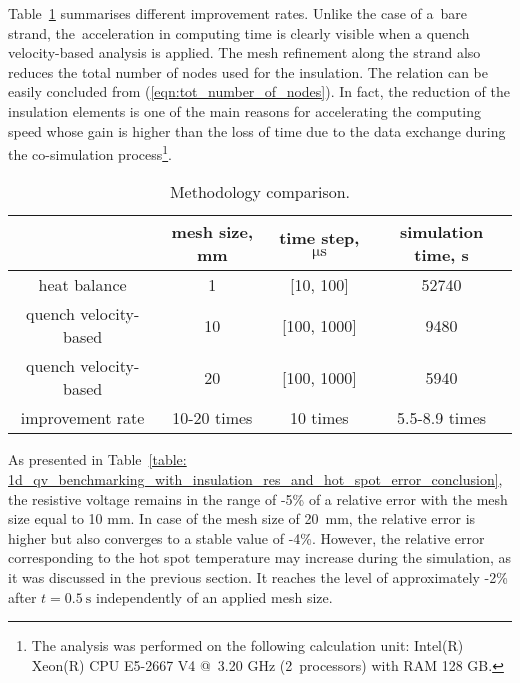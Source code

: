 
Table~\ref{table: 1d_qv_benchmarking_with_insulation_methods_comparison} summarises different improvement rates. Unlike the case of a~bare strand, the~acceleration in computing time is clearly visible when a quench velocity-based analysis is applied. The mesh refinement along the strand also reduces the total number of nodes used for the insulation. The relation can be easily concluded from (\ref{eqn:tot_number_of_nodes}). In fact, the reduction of the insulation elements is one of the main reasons for accelerating the computing speed whose gain is higher than the loss of time due to the data exchange during the co-simulation process\footnote{The analysis was performed on the following calculation unit: Intel(R) Xeon(R) CPU E5-2667 V4 @~3.20 GHz (2~processors) with RAM 128 GB.}.

\begin{table}[H]
    \caption{Methodology comparison.} 
    \vspace{-1.em} 
    \fontsize{10}{10}
    \selectfont 
    \renewcommand{\arraystretch}{1.5}
    \begin{center}
        \begin{tabular}{ cccc }  
        \hline
          & mesh size, mm & time step, $\upmu \text{s}$ & simulation time, s\\
        \hline
        heat balance & 1 & [10, 100] & 52740 \\
        quench velocity-based & 10 & [100, 1000] & 9480 \\
        quench velocity-based & 20 & [100, 1000] & 5940 \\
        \hline 
        improvement rate & 10-20 times & 10 times & 5.5-8.9 times \\
        \end{tabular}
    \end{center}  
     \label{table: 1d_qv_benchmarking_with_insulation_methods_comparison} 
 \end{table}
 
As presented in Table~\ref{table: 1d_qv_benchmarking_with_insulation_res_and_hot_spot_error_conclusion}, the resistive voltage remains in the range of -5\% of a relative error with the mesh size equal to 10 mm. In case of the mesh size of 20~mm, the relative error is higher but also converges to a stable value of -4\%. However, the relative error corresponding to the hot spot temperature may increase during the simulation, as it was discussed in the previous section. It reaches the level of approximately -2\% after $t=0.5~\text{s}$ independently of an applied mesh size. 

